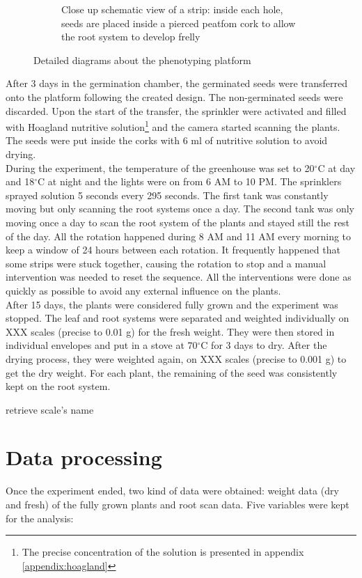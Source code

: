 \begin{figure}[!htb]
\begin{subfigure}[b]{0.475\textwidth}
            \caption{Close up schematic view of a strip: inside each hole, seeds are placed inside a pierced peatfom cork to allow the root system to develop frelly}    
            \label{fig:seed_platform_close_up}
        \end{subfigure}
        \caption{Detailed diagrams about the phenotyping platform}
    \end{figure}

After 3 days in the germination chamber, the germinated seeds were transferred onto the platform following the created design. The non-germinated seeds were discarded. Upon the start of the transfer, the sprinkler were activated and filled with Hoagland nutritive solution\footnote{The precise concentration of the solution is presented in appendix \ref{appendix:hoagland}} and the camera started scanning the plants. The seeds were put inside the corks with 6 ml of nutritive solution to avoid drying.\\
During the experiment, the temperature of the greenhouse was set to 20$^{\circ}$C at day and 18$^{\circ}$C at night and the lights were on from 6 AM to 10 PM. The sprinklers sprayed solution 5 seconds every 295 seconds. The first tank was constantly moving but only scanning the root systems once a day. The second tank was only moving once a day to scan the root system of the plants and stayed still the rest of the day. All the rotation happened during 8 AM and 11 AM every morning to keep a window of 24 hours between each rotation. It frequently happened that some strips were stuck together, causing the rotation to stop and a manual intervention was needed to reset the sequence. All the interventions were done as quickly as possible to avoid any external influence on the plants.\\
After 15 days, the plants were considered fully grown and the experiment was stopped. The leaf and root systems were separated and weighted individually on XXX scales (precise to 0.01 g) for the fresh weight. They were then stored in individual envelopes and put in a stove at 70$^{\circ}$C for 3 days to dry. After the drying process, they were weighted again, on XXX scales (precise to 0.001 g) to get the dry weight. For each plant, the remaining of the seed was consistently kept on the root system.\\
\begin{formal}
retrieve scale's name
\end{formal}

\section{Data processing}
Once the experiment ended, two kind of data were obtained: weight data (dry and fresh) of the fully grown plants and root scan data. Five variables were kept for the analysis:

